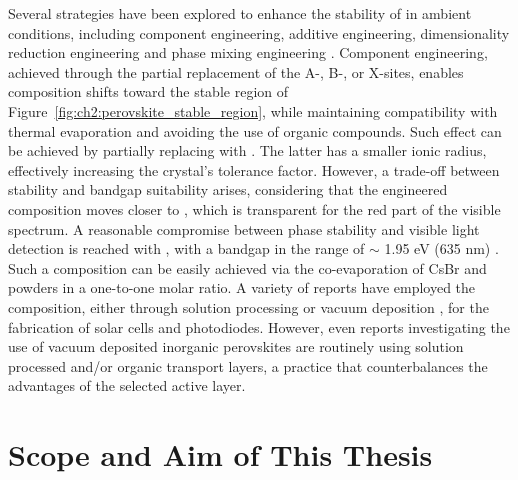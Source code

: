 Several strategies have been explored to enhance the stability of  in ambient conditions, including component engineering, additive engineering, dimensionality reduction engineering and phase mixing engineering \cite{Lei2024StabilityPerovskites, Jin2024PhaseDevices}. Component engineering, achieved through the partial replacement of the A-, B-, or X-sites, enables composition shifts toward the stable region of Figure~\ref{fig:ch2:perovskite_stable_region}, while maintaining compatibility with thermal evaporation and avoiding the use of organic compounds. Such effect can be achieved by partially replacing  with . The latter has a smaller ionic radius, effectively increasing the crystal's tolerance factor. However, a trade-off between stability and bandgap suitability arises, considering that the engineered composition moves closer to , which is transparent for the red part of the visible spectrum. A reasonable compromise between phase stability and visible light detection is reached with , with a bandgap in the range of $\sim$ 1.95 eV (635 nm) \cite{Nasstrom2020DependenceExperimentation}. Such a composition can be easily achieved via the co-evaporation of CsBr and  powders in a one-to-one molar ratio. A variety of reports have employed the  composition, either through solution processing \cite{Roy2025All-inorganicLayers, Zhang2019HighCells,Dong2021High-TemperatureCells,Zhang2021ModificationEfficiency,Wang2020HighlyBase,Zheng2021ImprovedCells,Mariotti2018StabilityDevices,Mali2019Hot-Air-AssistedCells}  or vacuum deposition \cite{Lin2019EfficientDeposition,Chen2017All-Vacuum-Deposited11,Igual-Munoz2020Room-TemperaturePrecursors, Ma2017TheCells, Lai2022All-Vacuum-DepositedCm-3}, for the fabrication of solar cells and photodiodes. However, even reports investigating the use of vacuum deposited inorganic perovskites are routinely using solution processed and/or organic transport layers, a practice that counterbalances the advantages of the selected active layer. 


\section{Scope and Aim of This Thesis} \label{sec:scope_and_aim}

